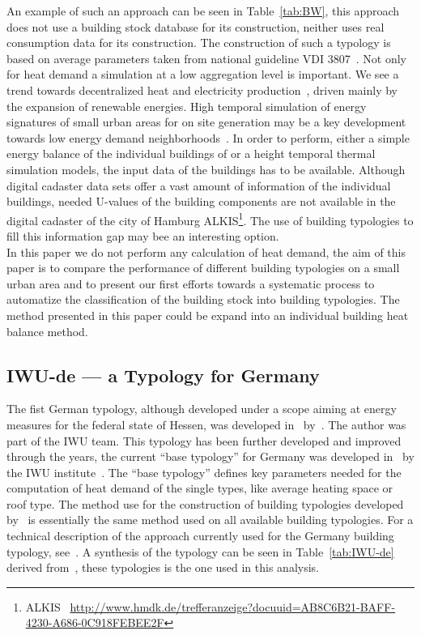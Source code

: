 \documentclass[authoryear,preprint,review,12pt]{elsarticle}
\begin{document}
\begin{linenumbers}
An example of such an approach can be seen in Table~\ref{tab:BW}, this approach
does not use a building stock database for its construction, neither uses real
consumption data for its construction.  The construction of such a typology is
based on average parameters taken from national guideline VDI
3807~\cite{VDI-3807.1994}.  Not only for heat demand a simulation at a low
aggregation level is important.  We see a trend towards decentralized heat and
electricity production~\cite{KEMA.2012}, driven mainly by the expansion of
renewable energies. High temporal simulation of energy signatures of small
urban areas for on site generation may be a key development towards low energy
demand neighborhoods~\cite{Koch.2013}.  In order to perform, either a simple
energy balance of the individual buildings of or a height temporal thermal
simulation models, the input data of the buildings has to be available.
Although digital cadaster data sets offer a vast amount of information of the
individual buildings, needed U-values of the building components are not
available in the digital cadaster of the city of Hamburg
ALKIS\footnote{ALKIS~\cite{AdV.2008}
\url{http://www.hmdk.de/trefferanzeige?docuuid=AB8C6B21-BAFF-4230-A686-0C918FEBEE2F}}.
The use of building typologies to fill this information gap may bee an
interesting option.\\



In this paper we do not perform any calculation of heat demand, the aim of this
paper is to compare the performance of different building typologies on a small
urban area and to present our first efforts towards a systematic process to
automatize the classification of the building stock into building typologies.
The method presented in this paper could be expand into an individual building
heat balance method.\\

\subsection{IWU-de --- a Typology for Germany}\label{sub-sec:IWU-de}

The fist German typology, although developed under a scope aiming at energy
measures for the federal state of Hessen, was developed in~\citeyear{Ebel.1990}
by~\citeauthor{Ebel.1990}. The author was part of the IWU team.  This typology
has been further developed and improved through the years, the current ``base
typology'' for Germany was developed in~\citeyear{IWU.2003} by the IWU
institute~\cite{IWU.2003}.  The ``base typology'' defines key parameters
needed for the computation of heat demand of the single types, like average
heating space or roof type.  The method use for the construction of
building typologies developed by~\cite{Ebel.1990} is essentially the same
method used on all available building typologies.  For a technical description
of the approach currently used for the Germany building typology,
see~\cite{Loga.2012}.  A synthesis of the typology can be seen in
Table~\ref{tab:IWU-de} derived from~\cite{Loga.2011}, these typologies is the one
used in this analysis.\\


\end{linenumbers}
\end{document}
